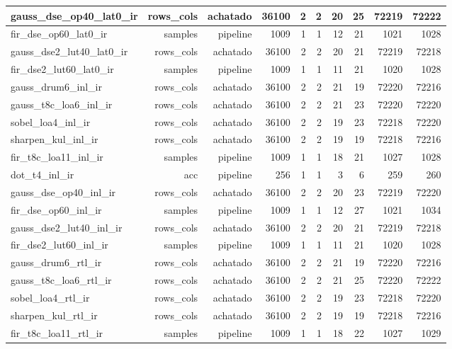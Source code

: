 \begin{table}[htbp]
\begin{tabular}{|l|r|r|r|r|r|r|r|r|r|}
gauss\_dse\_op40\_lat0\_ir & rows\_cols & achatado & 36100 & 2 & 2 & 20 & 25 & 72219 & 72222 \\ \hline
fir\_dse\_op60\_lat0\_ir & samples & pipeline & 1009 & 1 & 1 & 12 & 21 & 1021 & 1028 \\ \hline
gauss\_dse2\_lut40\_lat0\_ir & rows\_cols & achatado & 36100 & 2 & 2 & 20 & 21 & 72219 & 72218 \\ \hline
fir\_dse2\_lut60\_lat0\_ir & samples & pipeline & 1009 & 1 & 1 & 11 & 21 & 1020 & 1028 \\ \hline
gauss\_drum6\_inl\_ir & rows\_cols & achatado & 36100 & 2 & 2 & 21 & 19 & 72220 & 72216 \\ \hline
gauss\_t8c\_loa6\_inl\_ir & rows\_cols & achatado & 36100 & 2 & 2 & 21 & 23 & 72220 & 72220 \\ \hline
sobel\_loa4\_inl\_ir & rows\_cols & achatado & 36100 & 2 & 2 & 19 & 23 & 72218 & 72220 \\ \hline
sharpen\_kul\_inl\_ir & rows\_cols & achatado & 36100 & 2 & 2 & 19 & 19 & 72218 & 72216 \\ \hline
fir\_t8c\_loa11\_inl\_ir & samples & pipeline & 1009 & 1 & 1 & 18 & 21 & 1027 & 1028 \\ \hline
dot\_t4\_inl\_ir & acc & pipeline & 256 & 1 & 1 & 3 & 6 & 259 & 260 \\ \hline
gauss\_dse\_op40\_inl\_ir & rows\_cols & achatado & 36100 & 2 & 2 & 20 & 23 & 72219 & 72220 \\ \hline
fir\_dse\_op60\_inl\_ir & samples & pipeline & 1009 & 1 & 1 & 12 & 27 & 1021 & 1034 \\ \hline
gauss\_dse2\_lut40\_inl\_ir & rows\_cols & achatado & 36100 & 2 & 2 & 20 & 21 & 72219 & 72218 \\ \hline
fir\_dse2\_lut60\_inl\_ir & samples & pipeline & 1009 & 1 & 1 & 11 & 21 & 1020 & 1028 \\ \hline
gauss\_drum6\_rtl\_ir & rows\_cols & achatado & 36100 & 2 & 2 & 21 & 19 & 72220 & 72216 \\ \hline
gauss\_t8c\_loa6\_rtl\_ir & rows\_cols & achatado & 36100 & 2 & 2 & 21 & 25 & 72220 & 72222 \\ \hline
sobel\_loa4\_rtl\_ir & rows\_cols & achatado & 36100 & 2 & 2 & 19 & 23 & 72218 & 72220 \\ \hline
sharpen\_kul\_rtl\_ir & rows\_cols & achatado & 36100 & 2 & 2 & 19 & 19 & 72218 & 72216 \\ \hline
fir\_t8c\_loa11\_rtl\_ir & samples & pipeline & 1009 & 1 & 1 & 18 & 22 & 1027 & 1029 \\ \hline

\end{tabular}
\end{table}
